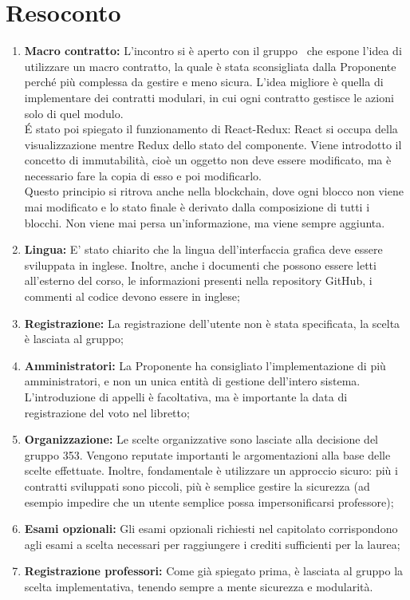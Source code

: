 \documentclass[VER-2017-12-08.tex]{subfiles}
\begin{document}
\chapter{Resoconto}
\begin{enumerate}
	\item \textbf{Macro contratto:} L'incontro si è aperto con il gruppo \gruppo\ che espone l'idea di utilizzare un macro contratto, la quale è stata sconsigliata dalla Proponente perché più complessa da gestire e meno sicura. L'idea migliore è quella di implementare dei contratti modulari, in cui ogni contratto gestisce le azioni solo di quel modulo.\\
	\'{E} stato poi spiegato il funzionamento di React-Redux: React si occupa della visualizzazione mentre Redux dello stato del componente. Viene introdotto il concetto di immutabilità, cioè un oggetto non deve essere modificato, ma è necessario fare la copia di esso e poi modificarlo.\\
	Questo principio si ritrova anche nella blockchain, dove ogni blocco non viene mai modificato e lo stato finale è derivato dalla composizione di tutti i blocchi. Non viene mai persa un'informazione, ma viene sempre aggiunta.
	\item \textbf{Lingua:} E' stato chiarito che la lingua dell'interfaccia grafica deve essere sviluppata in inglese. Inoltre, anche i documenti che possono essere letti all'esterno del corso, le informazioni presenti nella repository GitHub, i commenti al codice devono essere in inglese;
	\item \textbf{Registrazione:} La registrazione dell'utente non è stata specificata, la scelta è lasciata al gruppo;
	\item \textbf{Amministratori:} La Proponente ha consigliato l'implementazione di più amministratori, e non un unica entità di gestione dell'intero sistema. L'introduzione di appelli è facoltativa, ma è importante la data di registrazione del voto nel libretto;
	\item \textbf{Organizzazione:} Le scelte organizzative sono lasciate alla decisione del gruppo 353. Vengono reputate importanti le argomentazioni alla base delle scelte effettuate. Inoltre, fondamentale è utilizzare un approccio sicuro: più i contratti sviluppati sono piccoli, più è semplice gestire la sicurezza (ad esempio impedire che un utente semplice possa impersonificarsi professore);
	\item \textbf{Esami opzionali:} Gli esami opzionali richiesti nel capitolato corrispondono agli esami a scelta necessari per raggiungere i crediti sufficienti per la laurea;
	\item \textbf{Registrazione professori:} Come già spiegato prima, è lasciata al gruppo la scelta implementativa, tenendo sempre a mente sicurezza e modularità.
\end{enumerate}
\end{document}
